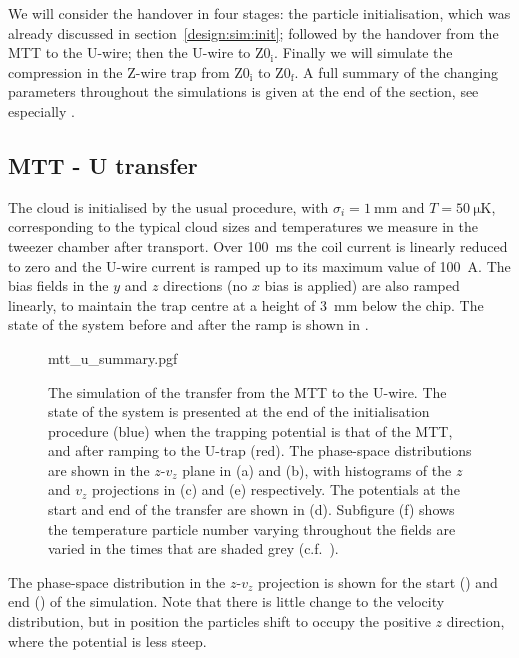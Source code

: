 We will consider the handover in four stages: the particle initialisation, which
was already discussed in section~\ref{design:sim:init}; followed by the
handover from the MTT to the U-wire; then the U-wire to $\mathrm{Z0_i}$.
Finally we will simulate the compression in the Z-wire trap from
$\mathrm{Z0_i}$ to $\mathrm{Z0_f}$. A full summary of the changing parameters
throughout the simulations is given at the end of the section, see especially
.

\subsection{MTT - U transfer}
\label{design:sim:trans_U}


The cloud is initialised by the usual procedure, with $\sigma_i =
\SI{1}{\milli\meter}$ and $T=\SI{50}{\micro\kelvin}$, corresponding to the
typical cloud sizes and temperatures we measure in the tweezer chamber after
transport. Over \SI{100}{\milli\second} the coil current is linearly
reduced to zero and the U-wire current is ramped up to its maximum value of
\SI{100}{\ampere}. The bias fields in the $y$ and $z$ directions (no $x$ bias
is applied) are also ramped linearly, to maintain the trap centre at a height
of \SI{3}{\milli\meter} below the chip. The state of the system before and
after the ramp is shown in .

\begin{figure}[p]
\centering
  {mtt_u_summary.pgf}
  \caption{
    The simulation of the transfer from the MTT to the U-wire. The state of the
    system is presented at the end of the initialisation procedure (blue) when
    the trapping potential is that of the MTT, and after ramping to the U-trap
    (red). The phase-space distributions are shown in the $z$-$v_z$ plane in
    (a) and (b), with histograms of the $z$ and $v_z$ projections in (c) and
    (e) respectively. The potentials at the start and end of the transfer are
    shown in (d). Subfigure (f) shows the temperature particle number varying
    throughout the fields are varied in the times that are shaded grey
    (c.f.~).
  }
  \label{design:fig:mttusim}
\end{figure}

The phase-space distribution in the $z$-$v_z$ projection is shown for the start
() and end
() of the simulation. Note that there is
little change to the velocity distribution, but in position the particles shift
to occupy the positive $z$ direction, where the potential is less steep.

